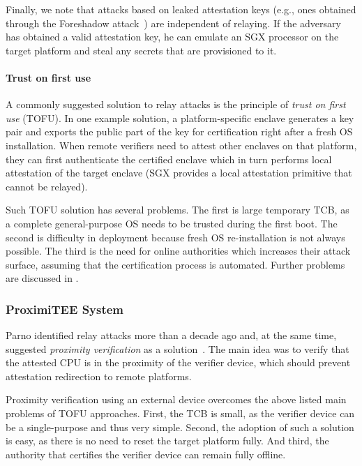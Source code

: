 \documentclass[letterpaper,twocolumn,10pt]{article}
\newcommand{\proximitee}{\textsf{ProximiTEE}\xspace}
\begin{document}
Finally, we note that attacks based on leaked attestation keys (e.g., ones obtained through the Foreshadow attack~\cite{van2018foreshadow}) are independent of relaying. If the adversary has obtained a valid attestation key, he can emulate an SGX processor on the target platform and steal any secrets that are provisioned to it.


\paragraph{Trust on first use}

A commonly suggested solution to relay attacks is the principle of \emph{trust on first use} (TOFU). In one example solution, a platform-specific enclave generates a key pair and exports the public part of the key for certification right after a fresh OS installation. When remote verifiers need to attest other enclaves on that platform, they can first authenticate the certified enclave which in turn performs local attestation of the target enclave (SGX provides a local attestation primitive that cannot be relayed).

Such TOFU solution has several problems. The first is large temporary TCB, as a complete general-purpose OS needs to be trusted during the first boot. The second is difficulty in deployment because fresh OS re-installation is not always possible. The third is the need for online authorities which increases their attack surface, assuming that the certification process is automated. Further problems are discussed in \cite{proximitee}.

 
\subsubsection*{\proximitee System}

Parno identified relay attacks more than a decade ago and, at the same time, suggested \emph{proximity verification} as a solution~\cite{parno2008bootstrapping}. The main idea was to verify that the attested CPU is in the proximity of the verifier device, which should prevent attestation redirection to remote platforms. 

Proximity verification using an external device overcomes the above listed main problems of TOFU approaches. First, the TCB is small, as the verifier device can be a single-purpose and thus very simple. Second, the adoption of such a solution is easy, as there is no need to reset the target platform fully. And third, the authority that certifies the verifier device can remain fully offline.
\end{document}
